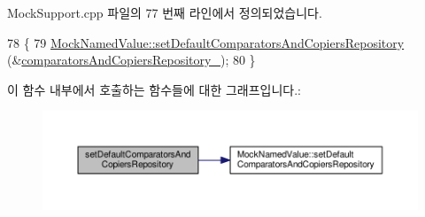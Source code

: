 Mock\+Support.\+cpp 파일의 77 번째 라인에서 정의되었습니다.


\begin{DoxyCode}
78 \{
79     \hyperlink{class_mock_named_value_a3588b9134e06ada808cfc04a11fcc7a7}{MockNamedValue::setDefaultComparatorsAndCopiersRepository}
      (&\hyperlink{class_mock_support_a372117e733b5aa30e4badf791416fd5f}{comparatorsAndCopiersRepository\_});
80 \}
\end{DoxyCode}


이 함수 내부에서 호출하는 함수들에 대한 그래프입니다.\+:
\nopagebreak
\begin{figure}[H]
\begin{center}
\leavevmode
\includegraphics[width=350pt]{class_mock_support_acab831c1aaad4786986f38b760c5c7dc_cgraph}
\end{center}
\end{figure}




